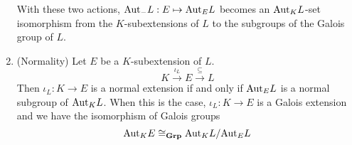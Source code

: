 \documentclass[../book.tex]{subfiles}
\begin{document}
\begin{thm}
\begin{enumerate}
            With these two actions, $\mathrm{Aut}_{-}L : E \mapsto \mathrm{Aut}_{E}L$
            becomes an $\mathrm{Aut}_{K}L$-set isomorphism from the $K$-subextensions of $L$
            to the subgroups of the Galois group of $L$. 
        \item (Normality)
            Let $E$ be a $K$-subextension of $L$. \[
                K \overset{\iota_L}{\longrightarrow} E \overset{\subseteq}{\longrightarrow} L
            \]
            Then $\iota_L : K \to E$ is a normal extension if and only if
            $\mathrm{Aut}_{E}L$ is a normal subgroup of $\mathrm{Aut}_{K}L$. 
            When this is the case, $\iota_L : K \to E$ is a Galois extension
            and we have the isomorphism of Galois groups \[
                \mathrm{Aut}_{K}E \cong_{\mathbf{Grp}} \mathrm{Aut}_{K}L / \mathrm{Aut}_{E}L
            \]
    \end{enumerate}
\end{thm}
\end{document}

